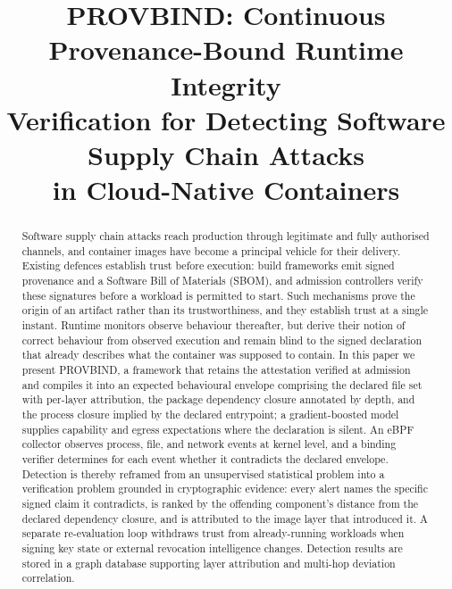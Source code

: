 \documentclass[conference]{IEEEtran}
\begin{document}
\title{PROVBIND: Continuous Provenance-Bound Runtime Integrity\\
Verification for Detecting Software Supply Chain Attacks\\
in Cloud-Native Containers}

\author{
}

\maketitle

\begin{abstract}
Software supply chain attacks reach production through legitimate and
fully authorised channels, and container images have become a principal
vehicle for their delivery. Existing defences establish trust before
execution: build frameworks emit signed provenance and a Software Bill
of Materials (SBOM), and admission controllers verify these signatures
before a workload is permitted to start. Such mechanisms prove the
origin of an artifact rather than its trustworthiness, and they establish
trust at a single instant. Runtime monitors observe behaviour
thereafter, but derive their notion of correct behaviour from observed
execution and remain blind to the signed declaration that already
describes what the container was supposed to contain. In this paper we
present PROVBIND, a framework that retains the attestation verified at
admission and compiles it into an expected behavioural envelope
comprising the declared file set with per-layer attribution, the package
dependency closure annotated by depth, and the process closure implied
by the declared entrypoint; a gradient-boosted model supplies capability
and egress expectations where the declaration is silent. An eBPF
collector observes process, file, and network events at kernel level,
and a binding verifier determines for each event whether it contradicts
the declared envelope. Detection is thereby reframed from an
unsupervised statistical problem into a verification problem grounded in
cryptographic evidence: every alert names the specific signed claim it
contradicts, is ranked by the offending component's distance from the
declared dependency closure, and is attributed to the image layer that
introduced it. A separate re-evaluation loop withdraws trust from
already-running workloads when signing key state or external revocation
intelligence changes. Detection results are stored in a graph database
supporting layer attribution and multi-hop deviation correlation.
\end{abstract}
\end{document}
